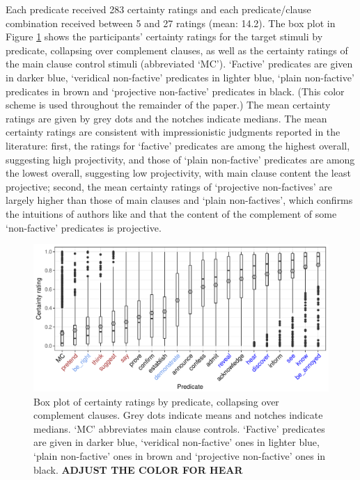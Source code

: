 \documentclass[11pt,fleqn]{article}
\newcommand{\6}{\mbox{$[\hspace*{-.6mm}[$}}
\newcommand{\9}{\mbox{$]\hspace*{-.6mm}]$}}
\newcommand{\citetpos}[1]{\citeauthor{#1}'s (\citeyear{#1})}
\begin{document}
Each predicate received 283 certainty ratings and each predicate/clause combination received between 5 and 27 ratings (mean: 14.2). The box plot in Figure \ref{f-projectivity} shows the participants' certainty ratings for the target stimuli by predicate, collapsing over complement clauses, as well as the certainty ratings of the main clause control stimuli (abbreviated `MC'). `Factive' predicates are given in darker blue, `veridical non-factive' predicates in lighter blue, `plain non-factive' predicates in brown and `projective non-factive' predicates in black. (This color scheme is used throughout the remainder of the paper.) The mean certainty ratings are given by grey dots and the notches indicate medians. 
The mean certainty ratings are consistent with impressionistic judgments reported in the literature: first, the ratings for `factive' predicates are among the highest overall, suggesting high projectivity, and those of `plain non-factive' predicates are among the lowest overall, suggesting low projectivity, with main clause content the least projective; second, the mean certainty ratings of `projective non-factives' are largely higher than those of main clauses and `plain non-factives', which confirms the intuitions of authors like \citet{schlenker10,anand-hacquard2014} and \citet{spector-egre2015} that the content of the complement of some `non-factive' predicates is projective.

\begin{figure}[H]
\centering

\includegraphics[width=.75\paperwidth]{../results/5-projectivity-no-fact/graphs/boxplot-projectivity}

\caption{Box plot of certainty ratings by predicate, collapsing over complement clauses. Grey dots indicate means and notches indicate medians. `MC' abbreviates main clause controls. `Factive' predicates are given in darker blue, `veridical non-factive' ones in lighter blue, `plain non-factive' ones in brown and `projective non-factive' ones in black. {\bf ADJUST THE COLOR FOR HEAR}}
\label{f-projectivity}
\end{figure}
\end{document}

